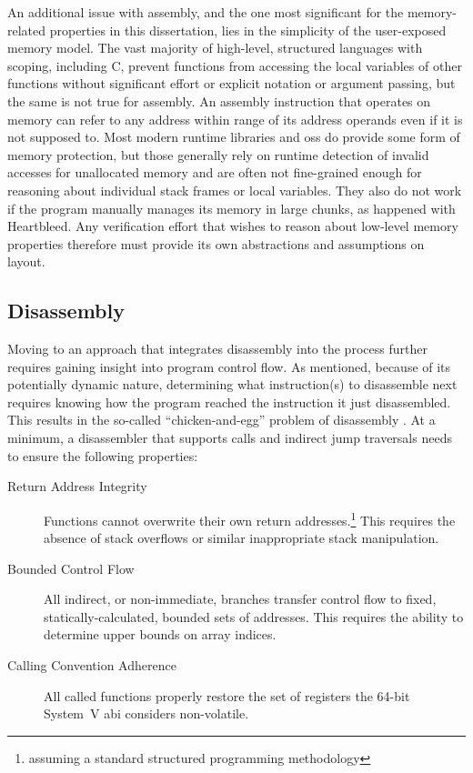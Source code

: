 An additional issue with assembly, and the one most significant for the memory-related properties in this dissertation, lies in the simplicity of the user-exposed memory model.
The vast majority of high-level, structured languages with scoping, including C, prevent functions from accessing the local variables of other functions without significant effort or explicit notation or argument passing, but the same is not true for assembly.
An assembly instruction that operates on memory can refer to any address within range of its address operands even if it is not supposed to.
Most modern runtime libraries and \acp{os} do provide some form of memory protection, but those generally rely on runtime detection of invalid accesses for unallocated memory and are often not fine-grained enough for reasoning about individual stack frames or local variables.
They also do not work if the program manually manages its memory in large chunks, as happened with Heartbleed.
Any verification effort that wishes to reason about low-level memory properties therefore must provide its own abstractions and assumptions on layout.

\subsection{Disassembly}\label{challenges-disassembly}
Moving to an approach that integrates disassembly into the process further requires gaining insight into program control flow.
As mentioned, because of its potentially dynamic nature, determining what instruction(s) to disassemble next requires knowing how the program reached the instruction it just disassembled.
This results in the so-called ``chicken-and-egg'' problem of disassembly \autocite{schwartz2002disassembly}.
At a minimum, a disassembler that supports calls and indirect jump traversals needs to ensure the following properties:
\begin{description}
  \item[Return Address Integrity] Functions cannot overwrite their own return addresses.\footnote{assuming a standard structured programming methodology} This requires the absence of stack overflows or similar inappropriate stack manipulation.
  \item[Bounded Control Flow] All indirect, or non-immediate, branches transfer control flow to fixed, statically-calculated, bounded sets of addresses. This requires the ability to determine upper bounds on array indices.
  \item[Calling Convention Adherence] All called functions properly restore the set of registers the 64-bit System~V \ac{abi} considers non-volatile.
\end{description}

